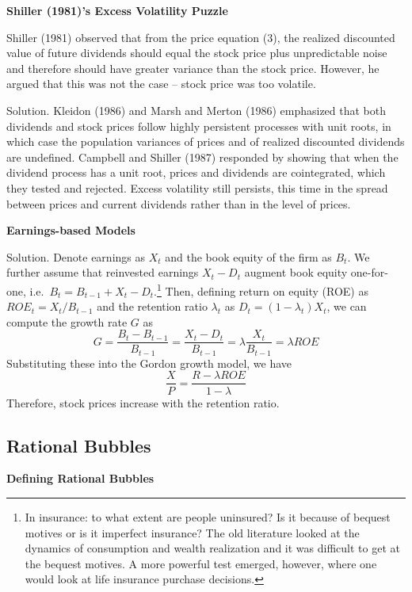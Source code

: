 \documentclass[
]{book}
\begin{document}
\textbf{Shiller (1981)'s Excess Volatility Puzzle}

Shiller (1981) observed that from the price equation (3), the realized discounted value of future dividends should equal the stock price plus unpredictable noise and therefore should have greater variance than the stock price. However, he argued that this was not the case -- stock price was too volatile.

Solution. Kleidon (1986) and Marsh and Merton (1986) emphasized that both dividends and stock prices follow highly persistent processes with unit roots, in which case the population variances of prices and of realized discounted dividends are undefined. Campbell and Shiller (1987) responded by showing that when the dividend process has a unit root, prices and dividends are cointegrated, which they tested and rejected. Excess volatility still persists, this time in the spread between prices and current dividends rather than in the level of prices.

\textbf{Earnings-based Models}

Solution. Denote earnings as \(X_{t}\) and the book equity of the firm as \(B_{t}\). We further assume that reinvested earnings \(X_{t}-D_{t}\) augment book equity one-for-one, i.e.~\(B_{t}=B_{t-1}+X_{t}-D_{t}\).\footnote{In insurance: to what extent are people uninsured? Is it because of bequest motives or is it imperfect insurance? The old literature looked at the dynamics of consumption and wealth realization and it was difficult to get at the bequest motives. A more powerful test emerged, however, where one would look at life insurance purchase decisions.} Then, defining return on equity (ROE) as \(ROE_{t}=X_{t}/B_{t-1}\) and the retention ratio \(\lambda_t\) as \(D_{t}=\left(1-\lambda_{t}\right)X_{t}\), we can compute the growth rate \(G\) as
\[
G=\frac{B_{t}-B_{t-1}}{B_{t-1}}=\frac{X_{t}-D_{t}}{B_{t-1}}=\lambda\frac{X_{t}}{B_{t-1}}=\lambda ROE
\]
Substituting these into the Gordon growth model, we have
\[
\frac{X}{P}=\frac{R-\lambda ROE}{1-\lambda}
\]
Therefore, stock prices increase with the retention ratio.

\hypertarget{rational-bubbles}{%
\subsection{\texorpdfstring{\textbf{Rational Bubbles}}{Rational Bubbles}}\label{rational-bubbles}}

\textbf{Defining Rational Bubbles}
\end{document}
